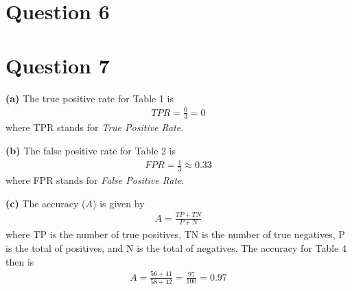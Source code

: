 \documentclass[leqno]{article}
\begin{document}
\section*{Question 6}

\hfill

\section*{Question 7} \textbf{(a)} The true positive rate for Table 1 is
\begin{equation*}
\begin{split}
TPR = \frac{0}{3} = 0
\end{split}
\end{equation*} 
where TPR stands for \textit{True Positive Rate}.

\hfill

\noindent \textbf{(b)} The false positive rate for Table 2 is
\begin{equation*}
\begin{split}
FPR = \frac{1}{3} \approx 0.33
\end{split}
\end{equation*} 
where FPR stands for \textit{False Positive Rate}.

\hfill

\noindent \textbf{(c)} The accuracy ($A$) is given by
\begin{equation*}
\begin{split}
A = \frac{TP + TN}{P + N}
\end{split}
\end{equation*} 
where TP is the number of true positives, TN is the number of true negatives, P is the total of positives, and N is 
the total of negatives. The accuracy for Table 4 then is
\begin{equation*}
\begin{split}
A = \frac{56 + 41}{58 + 42} = \frac{97}{100} = 0.97 
\end{split}
\end{equation*} 
\end{document}
